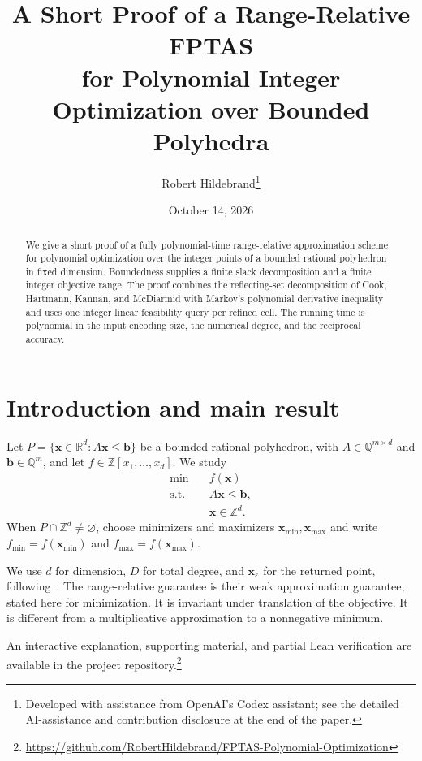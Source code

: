 \documentclass[11pt]{article}
\title{A Short Proof of a Range-Relative FPTAS\\for Polynomial Integer Optimization over Bounded Polyhedra}
\author{Robert Hildebrand\thanks{Developed with assistance from OpenAI's Codex assistant; see the detailed AI-assistance and contribution disclosure at the end of the paper.}}
\date{October 14, 2026}
\theoremstyle{definition}\newtheorem{definition}{Definition}[section]
\theoremstyle{remark}\newtheorem{remark}[theorem]{Remark}
\newcommand{\R}{\mathbb R}\newcommand{\Q}{\mathbb Q}\newcommand{\Z}{\mathbb Z}
\newcommand{\eps}{\varepsilon}
\begin{document}
\maketitle
\begin{abstract}
We give a short proof of a fully polynomial-time range-relative approximation scheme for polynomial optimization over the integer points of a bounded rational polyhedron in fixed dimension. Boundedness supplies a finite slack decomposition and a finite integer objective range. The proof combines the reflecting-set decomposition of Cook, Hartmann, Kannan, and McDiarmid with Markov's polynomial derivative inequality and uses one integer linear feasibility query per refined cell. The running time is polynomial in the input encoding size, the numerical degree, and the reciprocal accuracy.
\end{abstract}

\section{Introduction and main result}

Let $P=\{\mathbf{x}\in\R^d:A\mathbf{x}\le\mathbf b\}$ be a bounded rational polyhedron, with $A\in\Q^{m\times d}$ and $\mathbf b\in\Q^m$, and let $f\in\Z[x_1,\ldots,x_d]$. We study
\begin{equation}\label{eq:problem}
 \begin{aligned}
 \min\quad & f(\mathbf{x})\\
 \text{s.t.}\quad & A\mathbf{x}\le\mathbf b,\\
 & \mathbf{x}\in\Z^d.
 \end{aligned}
\end{equation}
When $P\cap\Z^d\ne\varnothing$, choose minimizers and maximizers $\mathbf{x}_{\min},\mathbf{x}_{\max}$ and write $f_{\min}=f(\mathbf{x}_{\min})$ and $f_{\max}=f(\mathbf{x}_{\max})$.

We use $d$ for dimension, $D$ for total degree, and $\mathbf{x}_{\eps}$ for the returned point, following~\cite{DHKW08}. The range-relative guarantee is their weak approximation guarantee, stated here for minimization. It is invariant under translation of the objective. It is different from a multiplicative approximation to a nonnegative minimum.

An interactive explanation, supporting material, and partial Lean verification are available in the project repository.\footnote{\url{https://github.com/RobertHildebrand/FPTAS-Polynomial-Optimization}}
\end{document}
